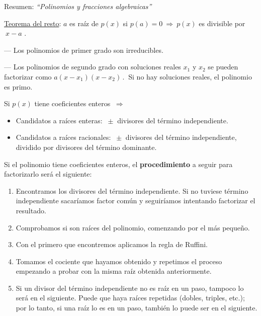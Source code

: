 \begin{myblock}{Resumen: \emph{``Polinomios y fracciones algebraicas''}}

\underline{Teorema del resto}:  $a$ es raíz de $p(x)$ si $p(a)=0 \ \Rightarrow \ p(x) $ es divisible por $\ x-a$ .

\vspace{2mm}
--- Los polinomios de primer grado son irreducibles.

--- Los polinomios de segundo grado con soluciones reales $x_1$ y $x_2$ se pueden factorizar como $a(x-x_1)(x-x_2)\, . \ $ Si no hay soluciones reales, el polinomio es primo.

\vspace{5mm} Si $p(x)$ tiene coeficientes enteros $\ \Rightarrow $

\begin{itemize}
\item Candidatos a raíces enteras: 	$\ \pm $ divisores del término independiente.
\item Candidatos a raíces racionales: 	$\ \pm $ divisores del término independiente, dividido por divisores del término dominante.
\end{itemize}


\vspace{3mm}
\begin{small}
Si el polinomio tiene coeficientes enteros, el \textbf{procedimiento} a seguir para factorizarlo será el siguiente:

\begin{enumerate}
\vspace{-2mm}\item Encontramos los divisores del término independiente. Si no tuviese término independiente sacaríamos factor común y seguiríamos intentando factorizar el resultado.

\vspace{-2mm}\item Comprobamos si son raíces del polinomio, comenzando
por el más pequeño.

\vspace{-2mm}\item Con el primero que encontremos aplicamos la regla de
Ruffini.

\vspace{-2mm}\item Tomamos el cociente que hayamos obtenido y
repetimos el proceso empezando a probar con la misma
raíz obtenida anteriormente.

\vspace{-2mm}\item Si un divisor del término independiente no es raíz en un
paso, tampoco lo será en el siguiente. Puede que haya raíces repetidas (dobles, triples, etc.); por lo tanto, si una raíz lo es en un paso, también lo puede ser en el siguiente.


\end{enumerate}
\end{small}
\end{myblock}
